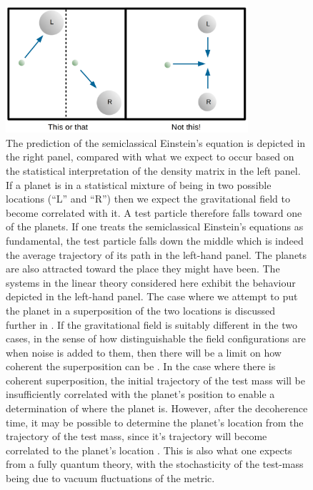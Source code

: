 \documentclass[aps,pra,showpacs,citeautoscript,amsmath,amssymb,floatfix,superscriptaddress,bbm, verbatim,amsfonts,changes,11pt,nofootinbib,longbibliography]{revtex4-2}
\begin{document}
\begin{figure}[h]
\includegraphics[width=0.8\textwidth]{notthis.png}
\caption{The prediction of the semiclassical Einstein's equation is depicted in the right panel, compared with what we expect to occur based on the statistical interpretation of the density matrix in the left panel. If a planet is in a statistical mixture of being in two possible locations (``L'' and ``R'') then we expect the gravitational field to become correlated with it. A test particle therefore falls toward one of the planets. If one treats the semiclassical Einstein's equations as fundamental, the test particle falls down the middle which is indeed the average trajectory of its path in the left-hand panel. The planets are also attracted toward the place they might have been. The systems in the linear theory considered here exhibit the behaviour depicted in the left-hand panel.
The case where we attempt to put the planet in a superposition of the two locations is discussed further in
 \cite{layton2022semi,UCLcoherence}. If the gravitational field is suitably different in the two cases, in the sense of how distinguishable the field configurations  are when noise is added to them, then there will be a limit on how coherent the superposition can be \cite{UCLcoherence}. In the case where there is coherent superposition, the initial trajectory of the test mass will be insufficiently correlated with the planet's position to enable a determination of where the planet is. However, after the decoherence time, it may be possible to determine the planet's location from the trajectory of the test mass, since it's trajectory will become correlated to the planet's location \cite{layton2022semi}. This is also what one expects from a fully quantum theory, with the stochasticity of the test-mass being due to vacuum fluctuations of the metric. %
}
\label{fig:notthis}
\end{figure}
\end{document}
